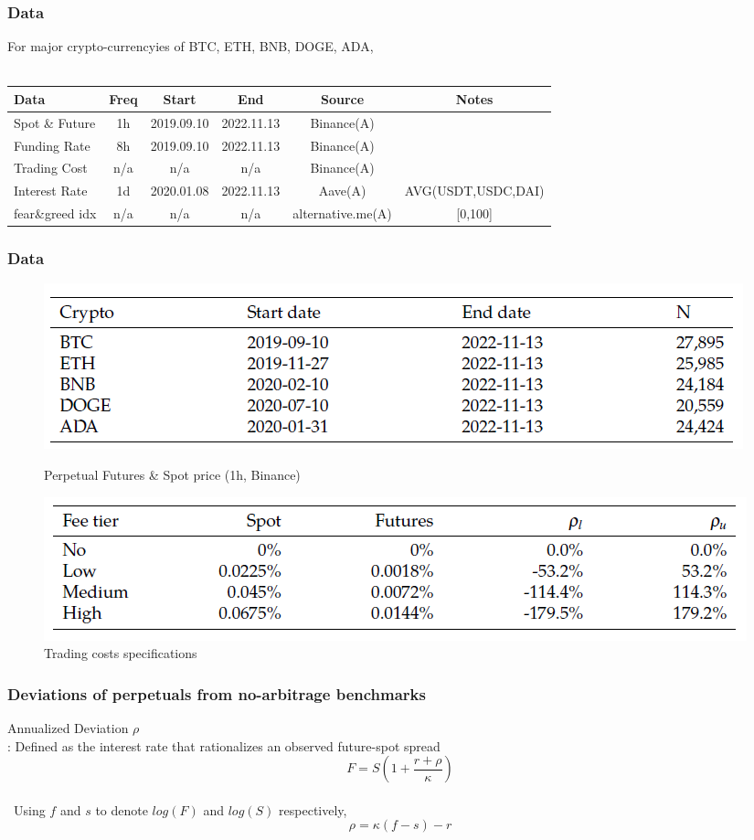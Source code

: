 \documentclass{beamer}
\begin{document}
\begin{frame}
\frametitle{Data}
For major crypto-currencyies of BTC, ETH, BNB, DOGE, ADA,\\~\\
\begin{table}
\footnotesize
\begin{tabular}{l | c | c | c | c | c}
Data & Freq & Start & End & Source & Notes\\
\hline \hline
Spot \& Future & 1h & 2019.09.10 & 2022.11.13 & Binance(A) & \\ 
Funding Rate & 8h & 2019.09.10 & 2022.11.13 & Binance(A) &\\
Trading Cost & n/a & n/a & n/a & Binance(A) & \\
Interest Rate & 1d & 2020.01.08 & 2022.11.13 & Aave(A) & \tiny AVG(USDT,USDC,DAI)\\
fear\&greed idx & n/a & n/a & n/a & \tiny alternative.me(A) & [0,100]\\
\end{tabular}
\end{table}
\end{frame}

\begin{frame}
\frametitle{Data}
\begin{figure}
    \includegraphics[scale=0.8]{figs/Table2.png}
    \caption{Perpetual Futures \& Spot price (1h, Binance)}
        \includegraphics[scale=0.8]{figs/Table3.png}
    \caption{Trading costs specifications}
\end{figure}
\end{frame}

\begin{frame}
\frametitle{Deviations of perpetuals from no-arbitrage benchmarks}
Annualized Deviation $\rho$ \\: Defined as the interest rate that rationalizes an observed future-spot spread$$F=S\left(1+\frac{r+\rho}{\kappa}\right)$$~\\~Using $f$ and $s$ to denote $log(F)$ and $log(S)$ respectively, $$\rho=\kappa(f-s)-r$$
\end{frame}
\end{document}
